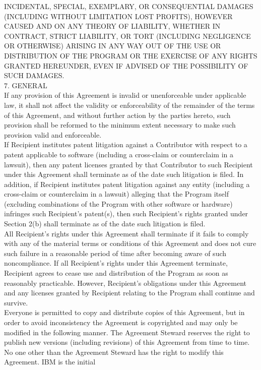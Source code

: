 {INCIDENTAL, SPECIAL, EXEMPLARY, OR CONSEQUENTIAL DAMAGES (INCLUDING
WITHOUT LIMITATION LOST PROFITS), HOWEVER CAUSED AND ON ANY THEORY OF
LIABILITY, WHETHER IN CONTRACT, STRICT LIABILITY, OR TORT (INCLUDING
NEGLIGENCE OR OTHERWISE) ARISING IN ANY WAY OUT OF THE USE OR
DISTRIBUTION OF THE PROGRAM OR THE EXERCISE OF ANY RIGHTS GRANTED
HEREUNDER, EVEN IF ADVISED OF THE POSSIBILITY OF SUCH DAMAGES.
\\[4pt]
7. GENERAL
\\[4pt]
If any provision of this Agreement is invalid or unenforceable under
applicable law, it shall not affect the validity or enforceability of
the remainder of the terms of this Agreement, and without further
action by the parties hereto, such provision shall be reformed to the
minimum extent necessary to make such provision valid and enforceable.
\\[4pt]
If Recipient institutes patent litigation against a Contributor with
respect to a patent applicable to software (including a cross-claim or
counterclaim in a lawsuit), then any patent licenses granted by that
Contributor to such Recipient under this Agreement shall terminate as
of the date such litigation is filed. In addition, if Recipient
institutes patent litigation against any entity (including a
cross-claim or counterclaim in a lawsuit) alleging that the Program
itself (excluding combinations of the Program with other software or
hardware) infringes such Recipient's patent(s), then such Recipient's
rights granted under Section 2(b) shall terminate as of the date such
litigation is filed.
\\[4pt]
All Recipient's rights under this Agreement shall terminate if it
fails to comply with any of the material terms or conditions of this
Agreement and does not cure such failure in a reasonable period of
time after becoming aware of such noncompliance. If all Recipient's
rights under this Agreement terminate, Recipient agrees to cease use
and distribution of the Program as soon as reasonably
practicable. However, Recipient's obligations under this Agreement and
any licenses granted by Recipient relating to the Program shall
continue and survive.
\\[4pt]
Everyone is permitted to copy and distribute copies of this Agreement,
but in order to avoid inconsistency the Agreement is copyrighted and
may only be modified in the following manner. The Agreement Steward
reserves the right to publish new versions (including revisions) of
this Agreement from time to time. No one other than the Agreement
Steward has the right to modify this Agreement. IBM is the initial
}
